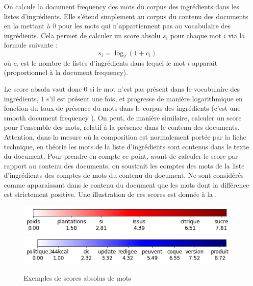         On calcule la \og document frequency \fg des mots du corpus des ingrédients dans les listes d'ingrédients.
        Elle s'étend simplement au corpus du contenu des documents en la mettant à 0 pour les mots qui n'appartiennent pas au vocabulaire des ingrédients.
        Cela permet de calculer un score absolu $s_{i}$ pour chaque mot $i$ via la formule suivante :
        \[s_{i} = \log_{2}(1 + c_{i})\]
        où $c_{i}$ est le nombre de listes d'ingrédients dans lequel le mot $i$ apparaît (proportionnel à la document frequency).
       
        Le score absolu vaut donc $0$ si le mot n'est pas présent dans le vocabulaire des ingrédients, $1$ s'il est présent une fois, et progresse de manière logarithmique en fonction du taux de présence du mots dans le corpus des ingrédients (c'est une \og smooth document frequency \fg).
        On peut, de manière similaire, calculer un score pour l'ensemble des mots, relatif à la présence dans le contenu des documents.
        Attention, dans la mesure où la composition est normalement portée par la fiche technique, en théorie les mots de la liste d'ingrédients sont contenus dans le texte du document.
        Pour prendre en compte ce point, avant de calculer le score par rapport au contenu des documents, on soustrait les comptes des mots de la liste d'ingrédients des comptes de mots du contenu du document.
        Ne sont considérés comme apparaissant dans le contenu du document que les mots dont la différence est strictement positive.
        Une illustration de ces scores est donnée à la .

        \begin{figure}[htbp]
            \begin{center}
            \includegraphics[width=0.6\linewidth]{img/scores_bar.png}
            \includegraphics[width=0.6\linewidth]{img/corpus_score_bar.png}
            \end{center}
            \caption{Exemples de scores absolus de mots}
            \label{fig:scores_bar}
        \end{figure}

